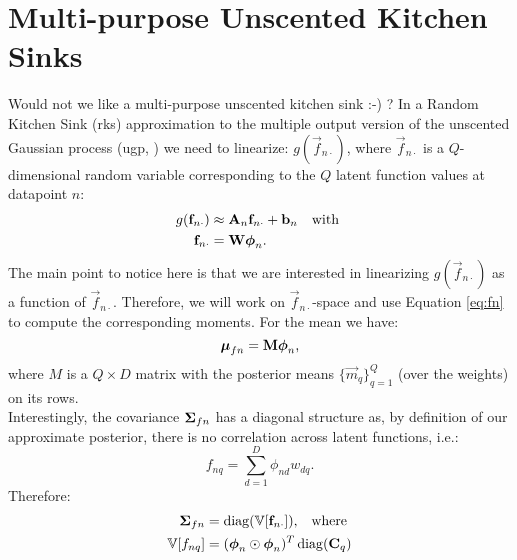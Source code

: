 \documentclass[11pt,a4paper]{article}
\newcommand{\m}{\vec{m}}
\renewcommand{\Q}{Q}
\newcommand{\rks}{{\sc rks}}
\newcommand{\ugp}{{\sc ugp}}
\newcommand{\f}{\vec{f}}
\newcommand{\fn}{\f_{n \cdot}}
\newcommand{\An}{\mat{A}_n}
\newcommand{\bn}{\vec{b}_n}
\renewcommand{\W}{\mat{W}}
\newcommand{\phin}{\vecS{\phi}_n}
\newcommand{\mufn}{\vecS{\mu}_{fn}}
\newcommand{\Sigmafn}{\mat{\Sigma}_{fn}}
\newcommand{\M}{\mat{M}}
\renewcommand{\D}{D}
\newcommand{\fnq}{f_{nq}}
\newcommand{\var}[1]{\mathbb{V}[#1]}
\begin{document}
\section{Multi-purpose Unscented Kitchen Sinks}
Would not we like a multi-purpose unscented kitchen sink :-) ? In a Random Kitchen Sink (\rks)
approximation to the multiple output version of the unscented Gaussian process (\ugp, ) we need to linearize: $g(\fn)$, where $\fn$ is a $\Q$-dimensional random variable corresponding to the $\Q$ latent function values at datapoint $n$:
\begin{align}
	g(\fn) & \approx \An \fn + \bn \quad \text{with }\\
	\label{eq:fn}
\fn &=  \W \phin \text{.}
\end{align}
The main point to notice here is that we are interested in linearizing $g(\fn)$ as a function of $\fn$. 
Therefore, we will work on $\fn$-space and use Equation \eqref{eq:fn} to compute the corresponding
moments. For the mean we have:
\begin{equation}
	\mufn = \M \phin \text{,}
\end{equation}
where $M$ is a $\Q \times \D$  matrix with the posterior means $\{ \m_q\}_{q=1}^{Q}$ (over 
the weights) on its rows. \\

Interestingly, the covariance $\Sigmafn$ has a diagonal structure as, by definition of our 
approximate posterior, there is no correlation across latent functions, i.e.:
\begin{equation}
	\fnq = \sum_{d=1}^{\D} \phi_{nd} w_{dq} \text{.}
\end{equation}
Therefore:
\begin{align}
	\Sigmafn &= \diag(\var{\fn}) \text{,} \quad \text{where } \\
	\var{\fnq} & = (\phin \hada \phin)^T \diag(\C_q) 
\end{align}
\end{document}
